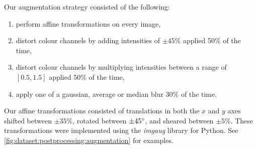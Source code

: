 \begin{table}[t]
\centering
\caption[Breakdown of training and validation data]{Breakdown of images and annotations (runners) used for training and validation.}
\label{tab:dataset:postprocessing:augmentation_quantities}
\end{table}

Our augmentation strategy consisted of the following:

\begin{enumerate}
  \item perform affine transformations on every image,
  \item distort colour channels by adding intensities of $\pm45\%$ applied 50\% of the time,
  \item distort colour channels by multiplying intensities between a range of $[0.5, 1.5]$ applied 50\% of the time,
  \item apply one of a gaussian, average or median blur 30\% of the time.
\end{enumerate}

Our affine transformations consisted of translations in both the $x$ and $y$ axes shifted between $\pm35\%$, rotated between $\pm45\degree$, and sheared between $\pm5\%$. These transformations were implemented using the \textit{imgaug} library for Python. See \cref{fig:dataset:postprocessing:augmentation} for examples.

